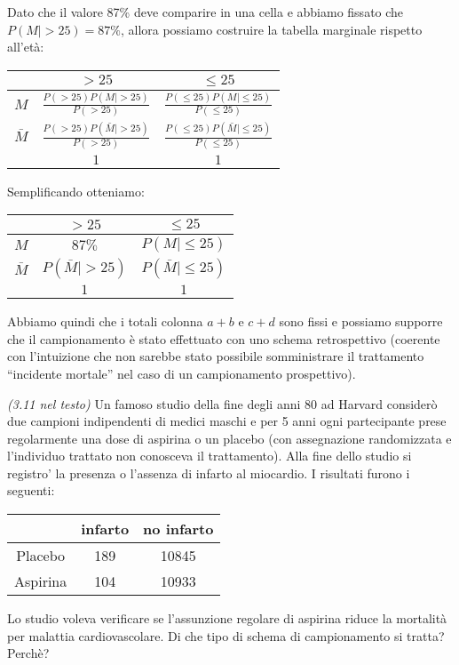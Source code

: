   Dato che il valore 87\% deve comparire in una cella e abbiamo
  fissato che $P(M| >25) = 87\%$, allora possiamo costruire la tabella
  marginale rispetto all'et\`a:
  \begin{table}[h]              %
    \centering
    \begin{tabular}{|c|c|c|}
      \hline
      & $>25$ & $\leq 25$ \\\hline
      $M$ & $\frac{P(>25)P(M| >25)}{P(>25)}$ & $\frac{P(\leq25)P(M|\leq25)}{P(\leq25)}$ \\
      $\bar{M}$ & $\frac{P(>25)P(\bar{M}| >25)}{P(>25)}$ &
      $\frac{P(\leq25)P(\bar{M}|\leq25)}{P(\leq25)}$ \\
      \hline
      & $1$ & $1$ \\
      \hline
    \end{tabular}
  \end{table}

  Semplificando otteniamo:
    \begin{table}[h]              %
    \centering
    \begin{tabular}{|c|c|c|}
      \hline
      & $>25$ & $\leq 25$ \\\hline
      $M$ & $87\%$ & $P(M|\leq25)$ \\
      $\bar{M}$ & $P(\bar{M}| >25)$ &
      $P(\bar{M}|\leq25)$ \\
      \hline
      & $1$ & $1$ \\
      \hline
    \end{tabular}
  \end{table}

  Abbiamo quindi che i totali colonna $a + b$ e $c + d$ sono fissi e
  possiamo supporre che il campionamento \`e stato effettuato con uno
  schema retrospettivo (coerente con l'intuizione che non sarebbe
  stato possibile somministrare il trattamento ``incidente mortale''
  nel caso di un campionamento prospettivo).

\begin{exercise}{\emph{(3.11 nel testo)}}
  Un famoso studio della fine degli anni 80 ad Harvard consider\`o due
  campioni indipendenti di medici maschi e per 5 anni ogni
  partecipante prese regolarmente una dose di aspirina o un placebo
  (con assegnazione randomizzata e l'individuo trattato non conosceva
  il trattamento). Alla fine dello studio si registro' la presenza o
  l'assenza di infarto al miocardio. I risultati furono i seguenti:
  \begin{table}[h]              %
    \centering
    \begin{tabular}{|c|c|c|}
      \hline
       & infarto & no infarto \\\hline
      Placebo & 189 & 10845 \\
      Aspirina & 104 & 10933  \\ \hline
    \end{tabular}
  \end{table}
  Lo studio voleva verificare se l'assunzione regolare di aspirina
  riduce la mortalit\`a per malattia cardiovascolare. Di che tipo di
  schema di campionamento si tratta?  Perch\`e?
\end{exercise}

